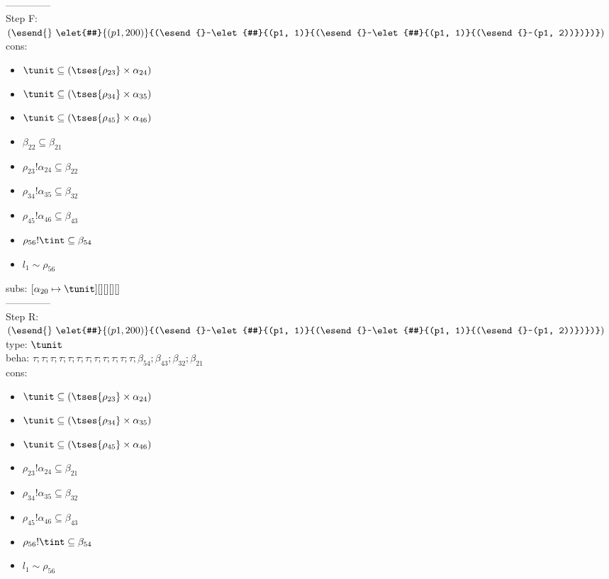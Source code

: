 \documentclass[12pt]{article}
\begin{document}
 \\--------------\\ 
Step F: $ (\esend{}~\elet{#}{(p1, 200)}{(\esend{}~\elet{#}{(p1, 1)}{(\esend{}~\elet{#}{(p1, 1)}{(\esend{}~(p1, 2))})})}) $
 \\ cons: \begin{itemize}
\item $ \tunit \subseteq ( \tses{ \rho_{23}} \times \alpha_{24}) $
\item $ \tunit \subseteq ( \tses{ \rho_{34}} \times \alpha_{35}) $
\item $ \tunit \subseteq ( \tses{ \rho_{45}} \times \alpha_{46}) $
\item $ \beta_{22} \subseteq \beta_{21} $
\item $ \rho_{23}!\alpha_{24} \subseteq \beta_{22} $
\item $ \rho_{34}!\alpha_{35} \subseteq \beta_{32} $
\item $ \rho_{45}!\alpha_{46} \subseteq \beta_{43} $
\item $ \rho_{56}!\tint \subseteq \beta_{54} $
\item $ l_{1} \sim\rho_{56} $
\end{itemize}
 subs:  $ [ \alpha_{20}\mapsto\tunit] [] [] [] [] $ 
  \\--------------\\ 
Step R: $ (\esend{}~\elet{#}{(p1, 200)}{(\esend{}~\elet{#}{(p1, 1)}{(\esend{}~\elet{#}{(p1, 1)}{(\esend{}~(p1, 2))})})}) $\\
  type: $ \tunit $ 
\\  beha: $ \tau; \tau; \tau; \tau; \tau; \tau; \tau; \tau; \tau; \tau; \tau; \tau; \beta_{54}; \beta_{43}; \beta_{32}; \beta_{21} $ 
\\  cons: \begin{itemize}
\item $ \tunit \subseteq ( \tses{ \rho_{23}} \times \alpha_{24}) $
\item $ \tunit \subseteq ( \tses{ \rho_{34}} \times \alpha_{35}) $
\item $ \tunit \subseteq ( \tses{ \rho_{45}} \times \alpha_{46}) $
\item $ \rho_{23}!\alpha_{24} \subseteq \beta_{21} $
\item $ \rho_{34}!\alpha_{35} \subseteq \beta_{32} $
\item $ \rho_{45}!\alpha_{46} \subseteq \beta_{43} $
\item $ \rho_{56}!\tint \subseteq \beta_{54} $
\item $ l_{1} \sim\rho_{56} $
\end{itemize} 
\end{document}
